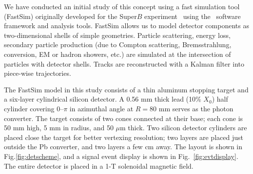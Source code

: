 We have conducted an initial study of this concept using a fast simulation
tool (FastSim) originally developed for the Super$B$ experiment~\cite{SuperB}
using the \babar\
software framework and analysis tools. FastSim allows us to model detector 
components as two-dimensional shells of simple geometries. Particle scattering,
energy loss, secondary particle production (due to Compton scattering, 
Bremsstrahlung, conversion, EM or hadron showers, etc.) are simulated at the
intersection of particles with detector shells. Tracks are reconstructed with
a Kalman filter into piece-wise trajectories.

The FastSim model in this study consists of a thin aluminum stopping target 
and a six-layer
cylindrical silicon detector. A 0.56 mm thick lead (10\% $X_0$) half cylinder 
covering 0--$\pi$ in azimuthal angle at $R = 80$ mm serves as the photon converter.
The target consists of two cones connected at their base; each cone is 50 mm 
high, 5 mm in radius, and 50 $\mu$m thick. Two silicon detector cylinders are
placed close the target for better vertexing resolution; two layers are placed
just outside the Pb converter, and two layers a few cm away. The layout is shown
in Fig.\ref{fig:detscheme}, and a signal event display is shown in 
Fig.~\ref{fig:evtdisplay}. The entire detector is placed in a 1-T solenoidal
magnetic field.



